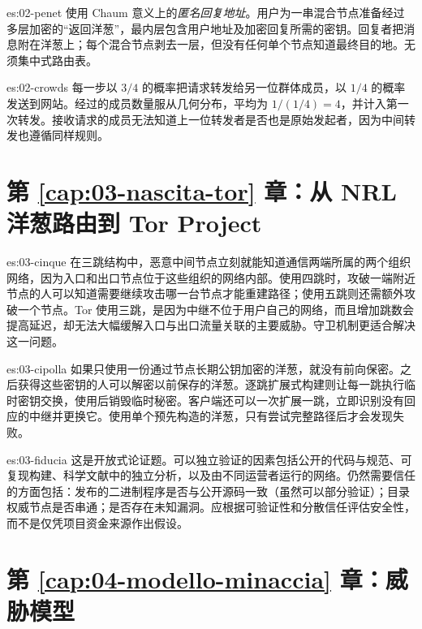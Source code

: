 \begin{soluzione}{es:02-penet}
使用 Chaum 意义上的\emph{匿名回复地址}。用户为一串混合节点准备经过多层加密的\enquote{返回洋葱}，最内层包含用户地址及加密回复所需的密钥。回复者把消息附在洋葱上；每个混合节点剥去一层，但没有任何单个节点知道最终目的地。无须集中式路由表。
\end{soluzione}

\begin{soluzione}{es:02-crowds}
每一步以 $3/4$ 的概率把请求转发给另一位群体成员，以 $1/4$ 的概率发送到网站。经过的成员数量服从几何分布，平均为 $1/(1/4)=4$，并计入第一次转发。接收请求的成员无法知道上一位转发者是否也是原始发起者，因为中间转发也遵循同样规则。
\end{soluzione}

\section*{第 \ref{cap:03-nascita-tor} 章：从 NRL 洋葱路由到 Tor Project}

\begin{soluzione}{es:03-cinque}
在三跳结构中，恶意中间节点立刻就能知道通信两端所属的两个组织网络，因为入口和出口节点位于这些组织的网络内部。使用四跳时，攻破一端附近节点的人可以知道需要继续攻击哪一台节点才能重建路径；使用五跳则还需额外攻破一个节点。Tor 使用三跳，是因为中继不位于用户自己的网络，而且增加跳数会提高延迟，却无法大幅缓解入口与出口流量关联的主要威胁。守卫机制更适合解决这一问题。
\end{soluzione}

\begin{soluzione}{es:03-cipolla}
如果只使用一份通过节点长期公钥加密的洋葱，就没有前向保密。之后获得这些密钥的人可以解密以前保存的洋葱。逐跳扩展式构建则让每一跳执行临时密钥交换，使用后销毁临时秘密。客户端还可以一次扩展一跳，立即识别没有回应的中继并更换它。使用单个预先构造的洋葱，只有尝试完整路径后才会发现失败。
\end{soluzione}

\begin{soluzione}{es:03-fiducia}
这是开放式论证题。可以独立验证的因素包括公开的代码与规范、可复现构建、科学文献中的独立分析，以及由不同运营者运行的网络。仍然需要信任的方面包括：发布的二进制程序是否与公开源码一致（虽然可以部分验证）；目录权威节点是否串通；是否存在未知漏洞。应根据可验证性和分散信任评估安全性，而不是仅凭项目资金来源作出假设。
\end{soluzione}

\section*{第 \ref{cap:04-modello-minaccia} 章：威胁模型}

